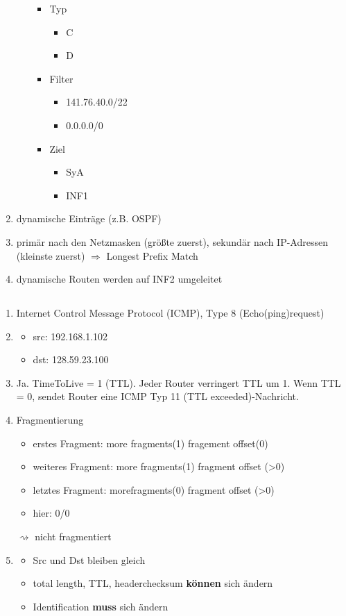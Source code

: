 \begin{enumerate}
\begin{itemize}
\begin{itemize}
			\item Typ
			\begin{itemize}
				\item C
				\item D
			\end{itemize}
			\item Filter
			\begin{itemize}
				\item 141.76.40.0/22
				\item 0.0.0.0/0
			\end{itemize}
			\item Ziel
			\begin{itemize}
				\item SyA
				\item INF1
			\end{itemize}
		\end{itemize}
\end{itemize}		
\item dynamische Einträge (z.B. OSPF)
\item primär nach den Netzmasken (größte zuerst), sekundär nach IP-Adressen (kleinste zuerst) $\Rightarrow$ Longest Prefix Match
\item dynamische Routen werden auf INF2 umgeleitet
\end{enumerate}
\subsection{}
\begin{enumerate}
	\item Internet Control Message Protocol (ICMP), Type 8 (Echo(ping)request)
	\item 
	\begin{itemize}
		\item src: 192.168.1.102
		\item dst: 128.59.23.100
	\end{itemize}
	\item Ja. TimeToLive = 1 (TTL). Jeder Router verringert TTL um 1. Wenn TTL = 0, sendet Router eine ICMP Typ 11 (TTL exceeded)-Nachricht.
	\item Fragmentierung
	\begin{itemize}
		\item erstes Fragment: more fragments(1) fragement offset(0)
		\item weiteres Fragment: more fragments(1) fragment offset (>0)
		\item letztes Fragment: morefragments(0) fragment offset (>0)
		\item hier: 0/0
	\end{itemize}
	$\rightsquigarrow$ nicht fragmentiert
	\item 
	\begin{itemize}
		\item Src und Dst bleiben gleich
		\item total length, TTL, headerchecksum \textbf{können} sich ändern
		\item Identification \textbf{muss} sich ändern
	\end{itemize}
\end{enumerate}
